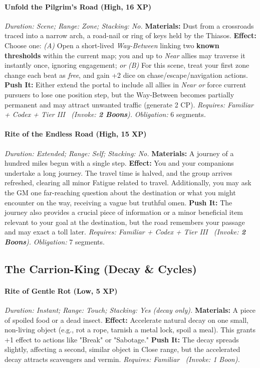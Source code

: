 \documentclass[12pt,twoside]{book}
\begin{document}
\paragraph{Unfold the Pilgrim's Road (High, 16 XP)} \emph{Duration: Scene; Range: Zone; Stacking: No.}
\textbf{Materials:} Dust from a crossroads traced into a narrow arch, a road-nail or ring of keys held by the Thiasos.
\textbf{Effect:} Choose one:
\emph{(A)} Open a short-lived \emph{Way-Between} linking two \textbf{known thresholds} within the current map; you and up to \emph{Near} allies may traverse it instantly once, ignoring engagement; \emph{or}
\emph{(B)} For this scene, treat your first zone change each beat as \emph{free}, and gain +2 dice on chase/escape/navigation actions.
\textbf{Push It:} Either extend the portal to include all allies in \emph{Near} \emph{or} force current pursuers to lose one position step, but the Way-Between becomes partially permanent and may attract unwanted traffic (generate 2 CP).
\emph{Requires: Familiar + Codex + Tier III \ (\textit{Invoke:} \textbf{2 Boons}).}
\emph{Obligation:} 6 segments.

\paragraph{Rite of the Endless Road (High, 15 XP)} \emph{Duration: Extended; Range: Self; Stacking: No.}
\textbf{Materials:} A journey of a hundred miles begun with a single step.
\textbf{Effect:} You and your companions undertake a long journey. The travel time is halved, and the group arrives refreshed, clearing all minor Fatigue related to travel. Additionally, you may ask the GM one far-reaching question about the destination or what you might encounter on the way, receiving a vague but truthful omen.
\textbf{Push It:} The journey also provides a crucial piece of information or a minor beneficial item relevant to your goal at the destination, but the road remembers your passage and may exact a toll later.
\emph{Requires: Familiar + Codex + Tier III \ (\textit{Invoke:} \textbf{2 Boons}).}
\emph{Obligation:} 7 segments.

\subsection{The Carrion-King (Decay \& Cycles)}
\paragraph{Rite of Gentle Rot (Low, 5 XP)} \emph{Duration: Instant; Range: Touch; Stacking: Yes (decay only).}
\textbf{Materials:} A piece of spoiled food or a dead insect.
\textbf{Effect:} Accelerate natural decay on one small, non-living object (e.g., rot a rope, tarnish a metal lock, spoil a meal). This grants +1 effect to actions like "Break" or "Sabotage."
\textbf{Push It:} The decay spreads slightly, affecting a second, similar object in Close range, but the accelerated decay attracts scavengers and vermin.
\emph{Requires: Familiar \ (\textit{Invoke:} 1 Boon).}
\end{document}
